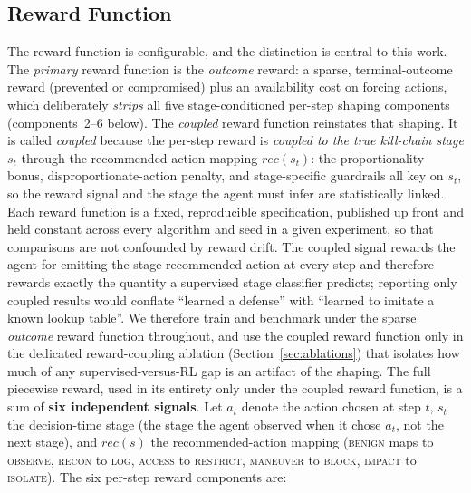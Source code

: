 \subsection{Reward Function}\label{ssec:reward}
The reward function is configurable, and the distinction is central to this work. The \emph{primary} reward function is the \emph{outcome} reward: a sparse, terminal-outcome reward (prevented or compromised) plus an availability cost on forcing actions, which deliberately \emph{strips} all five stage-conditioned per-step shaping components (components~2--6 below). The \emph{coupled} reward function reinstates that shaping. It is called \emph{coupled} because the per-step reward is \emph{coupled to the true kill-chain stage} $s_t$ through the recommended-action mapping $\mathit{rec}(s_t)$: the proportionality bonus, disproportionate-action penalty, and stage-specific guardrails all key on $s_t$, so the reward signal and the stage the agent must infer are statistically linked. Each reward function is a fixed, reproducible specification, published up front and held constant across every algorithm and seed in a given experiment, so that comparisons are not confounded by reward drift. The coupled signal rewards the agent for emitting the stage-recommended action at every step and therefore rewards exactly the quantity a supervised stage classifier predicts; reporting only coupled results would conflate ``learned a defense'' with ``learned to imitate a known lookup table''. We therefore train and benchmark under the sparse \emph{outcome} reward function throughout, and use the coupled reward function only in the dedicated reward-coupling ablation (Section~\ref{sec:ablations}) that isolates how much of any supervised-versus-RL gap is an artifact of the shaping. The full piecewise reward, used in its entirety only under the coupled reward function, is a sum of \textbf{six independent signals}. Let $a_t$ denote the action chosen at step $t$, $s_t$ the decision-time stage (the stage the agent observed when it chose $a_t$, not the next stage), and $\mathit{rec}(s)$ the recommended-action mapping (\textsc{benign} maps to \textsc{observe}, \textsc{recon} to \textsc{log}, \textsc{access} to \textsc{restrict}, \textsc{maneuver} to \textsc{block}, \textsc{impact} to \textsc{isolate}). The six per-step reward components are:
